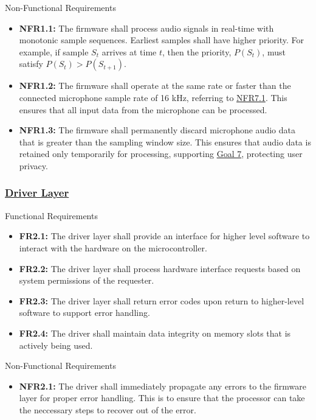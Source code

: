 \documentclass[12pt]{article}
\theoremstyle{definition}
\begin{document}
Non-Functional Requirements
\begin{itemize}
  \item \label{NFR1_1}\textbf{NFR1.1:} The firmware shall process audio signals
  in real-time with monotonic sample sequences. Earliest samples shall have
  higher priority. For example, if sample $S_t$ arrives at time $t$, then the
  priority, $P(S_t)$, must satisfy $P(S_t) > P(S_{t+1})$.
  
  \item \label{NFR1_2}\textbf{NFR1.2:} The firmware shall operate at the same
  rate or faster than the connected microphone sample rate of 16 kHz, referring
  to \hyperref[NFR7_1]{NFR7.1}. This ensures that all input data from the
  microphone can be processed.

  \item \label{NFR1_3}\textbf{NFR1.3:} The firmware shall permanently
  discard microphone audio data that is greater than the sampling window size.
  This ensures that audio data is retained only temporarily for processing,
  supporting \hyperref[goal:user_safety]{Goal 7}, protecting user privacy.
\end{itemize}

\subsubsection{\hyperref[comp:driver_layer]{Driver Layer}} Functional
Requirements \label{sec:FR2}
\begin{itemize}
  \item \label{FR2_1}\textbf{FR2.1:} The driver layer shall provide an interface
  for higher level software to interact with the hardware on the
  microcontroller.

  \item \label{FR2_2}\textbf{FR2.2:} The driver layer shall process hardware
  interface requests based on system permissions of the requester.

  \item \label{FR2_3}\textbf{FR2.3:} The driver layer shall return error codes
  upon return to higher-level software to support error handling.

  \item \label{FR2_4}\textbf{FR2.4:} The driver shall maintain data integrity on
  memory slots that is actively being used.
\end{itemize}

Non-Functional Requirements
\begin{itemize}
  \item \label{NFR2_1}\textbf{NFR2.1:} The driver shall immediately propagate
  any errors to the firmware layer for proper error handling. This is to ensure
  that the processor can take the neccessary steps to recover out of the error.
\end{itemize}
\end{document}

